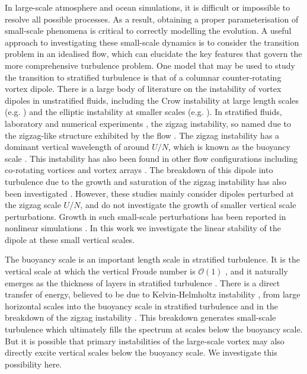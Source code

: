 In large-scale atmosphere and ocean simulations, it is difficult or impossible to resolve all possible processes. As a result, obtaining a proper parameterisation of small-scale phenomena is critical to correctly modelling the evolution. A useful approach to investigating these small-scale dynamics is to consider the transition problem in an idealised flow, which can elucidate the key features that govern the more comprehensive turbulence problem. One model that may be used to study the transition to stratified turbulence is that of a columnar counter-rotating vortex dipole. There is a large body of literature on the instability of vortex dipoles in unstratified fluids, including the Crow instability at large length scales (e.g. \cite{crow1970,widnall1974,leweke1998b}) and the elliptic instability at smaller scales (e.g. \cite{widnall1974,pierrehumbert1986,baily1986,waleffe1990}). In stratified fluids, laboratory and numerical experiments , the zigzag instability, so named due to the zigzag-like structure exhibited by the flow \cite{bc2000a,bc2000c}. The zigzag instability has a dominant vertical wavelength of around $U/N$, which is known as the buoyancy scale \cite{waite2011}. This instability has also been found in other flow configurations including co-rotating vortices \cite{otheguybc} and vortex arrays \cite{delonclebc2011}. The breakdown of this dipole into turbulence due to the growth and saturation of the zigzag instability has also been investigated \cite{waitesmol2008,augierbillant2011,delonclebc2008}. However, these studies mainly consider dipoles perturbed at the zigzag scale $U/N$, and do not investigate the growth of smaller vertical scale perturbations. Growth in such small-scale perturbations has been reported in nonlinear simulations \cite{waitesmol2008}. In this work we investigate the linear stability of the dipole at these small vertical scales. 

The buoyancy scale is an important length scale in stratified turbulence. It is the vertical scale at which the vertical Froude number is $\mathcal{O}(1)$ \cite{bc2001}, and it naturally emerges as the thickness of layers in stratified turbulence \cite{bc2001,waitebartello2004}. There is a direct transfer of energy, believed to be due to Kelvin-Helmholtz instability \cite{waite2011,augier2012}, from large horizontal scales into the buoyancy scale in stratified turbulence \cite{waite2011} and in the breakdown of the zigzag instability \cite{augier2012}. This breakdown generates small-scale turbulence which ultimately fills the spectrum at scales below the buoyancy scale. But it is possible that primary instabilities of the large-scale vortex may also directly excite vertical scales below the buoyancy scale. We investigate this possibility here. 

